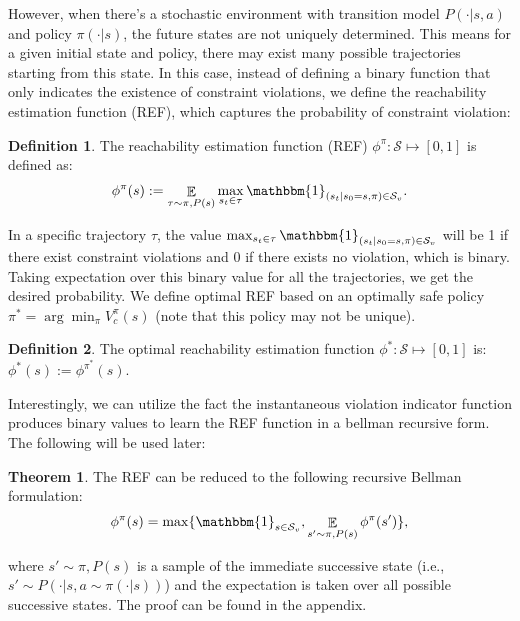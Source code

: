 \documentclass{article}
\theoremstyle{definition}
\newtheorem{definition}{Definition}
\DeclareMathOperator*{\E}{\mathbb{E}}
\newtheorem{theorem}{Theorem}
\begin{document}
However, when there's a stochastic environment with transition model $P(\cdot | s,a)$ and policy $\pi(\cdot | s)$, the future states are not uniquely determined. This means for a given initial state and policy, there may exist many possible trajectories starting from this state. In this case, instead of defining a binary function that only indicates the existence of constraint violations, we define the reachability estimation function (REF), which captures the probability of constraint violation:


\begin{definition} \label{def:REF} The reachability estimation function (REF) $ \phi^\pi : \mathcal S \mapsto [0,1]$ is defined as: 
\vspace{-3pt}
\begin{align*}
    \phi^\pi (s) := \E _{\tau \sim \pi,P(s)} \max _{s_t\in \tau} \mathbbm{1}_{(s_t|s_0 = s, \pi)\in \mathcal S_v}.
\end{align*}
\end{definition}
\vspace{-10pt}

In a specific trajectory $\tau$, the value $ \max _{s_t\in \tau} \mathbbm{1}_{(s_t|s_0 = s, \pi)\in \mathcal S_v}$ will be 1 if there exist constraint violations and 0 if there exists no violation, which is binary. Taking expectation over this binary value for all the trajectories, we get the desired probability. We define optimal REF based on an optimally safe policy $\pi^* = \arg\min_\pi V^\pi_c(s)$ (note that this policy may not be unique).
\begin{definition} \label{def:optimal REF} The optimal reachability estimation function $ \phi^* : \mathcal S \mapsto [0,1]$ is: $\phi^* (s) := \phi^{\pi^*} (s)$.
\end{definition}
\vspace{-5pt}

Interestingly, we can utilize the fact the instantaneous violation indicator function produces binary values to learn the REF function in a bellman recursive form. The following will be used later:
\begin{theorem}
\label{thm:BellmanREF}
    The REF can be reduced to the following recursive Bellman formulation:
    \vspace{-3pt}
    \begin{align*}
    \phi^\pi (s) = \max \{ \mathbbm{1}_{s\in \mathcal S_v} , \E_{s' \sim \pi,P(s)} \phi^\pi(s') \},
    \end{align*}
    
    \vspace{-10pt}
    where $s' \sim \pi,P(s)$ is a sample of the immediate successive state (i.e., $s' \sim P(\cdot| s , a\sim \pi(\cdot | s))$) and the expectation is taken over all possible successive states. The proof can be found in the appendix. 
\end{theorem}
\end{document}

